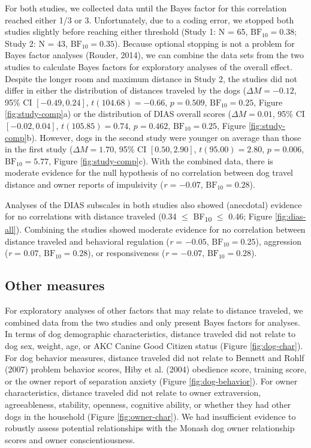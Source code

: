 \documentclass[
  pub,floatsintext]{apa6}
\begin{document}
For both studies, we collected data until the Bayes factor for this correlation reached either 1/3 or 3. Unfortunately, due to a coding error, we stopped both studies slightly before reaching either threshold (Study 1: N = 65, \(\mathrm{BF}_{\textrm{10}} = 0.38\); Study 2: N = 43, \(\mathrm{BF}_{\textrm{10}} = 0.35\)). Because optional stopping is not a problem for Bayes factor analyses (Rouder, 2014), we can combine the data sets from the two studies to calculate Bayes factors for exploratory analyses of the overall effect. Despite the longer room and maximum distance in Study 2, the studies did not differ in either the distribution of distances traveled by the dogs (\(\Delta M = -0.12\), 95\% CI \([-0.49, 0.24]\), \(t(104.68) = -0.66\), \(p = 0.509\), \(\mathrm{BF}_{\textrm{10}} = 0.25\), Figure \ref{fig:study-comp}a) or the distribution of DIAS overall scores (\(\Delta M = 0.01\), 95\% CI \([-0.02, 0.04]\), \(t(105.85) = 0.74\), \(p = 0.462\), \(\mathrm{BF}_{\textrm{10}} = 0.25\), Figure \ref{fig:study-comp}b). However, dogs in the second study were younger on average than those in the first study (\(\Delta M = 1.70\), 95\% CI \([0.50, 2.90]\), \(t(95.00) = 2.80\), \(p = 0.006\), \(\mathrm{BF}_{\textrm{10}} = 5.77\), Figure \ref{fig:study-comp}c). With the combined data, there is moderate evidence for the null hypothesis of no correlation between dog travel distance and owner reports of impulsivity (\emph{r} = \(-0.07\), \(\mathrm{BF}_{\textrm{10}} = 0.28\)).

Analyses of the DIAS subscales in both studies also showed (anecdotal) evidence for no correlations with distance traveled (0.34 \(\leq\) BF\textsubscript{10} \(\leq\) 0.46; Figure \ref{fig:dias-all}). Combining the studies showed moderate evidence for no correlation between distance traveled and behavioral regulation (\emph{r} = \(-0.05\), \(\mathrm{BF}_{\textrm{10}} = 0.25\)), aggression (\emph{r} = \(0.07\), \(\mathrm{BF}_{\textrm{10}} = 0.28\)), or responsiveness (\emph{r} = \(-0.07\), \(\mathrm{BF}_{\textrm{10}} = 0.28\)).

\hypertarget{other-measures}{%
\subsection{Other measures}\label{other-measures}}

For exploratory analyses of other factors that may relate to distance traveled, we combined data from the two studies and only present Bayes factors for analyses. In terms of dog demographic characteristics, distance traveled did not relate to dog sex, weight, age, or AKC Canine Good Citizen status (Figure \ref{fig:dog-char}). For dog behavior measures, distance traveled did not relate to Bennett and Rohlf (2007) problem behavior scores, Hiby et al. (2004) obedience score, training score, or the owner report of separation anxiety (Figure \ref{fig:dog-behavior}). For owner characteristics, distance traveled did not relate to owner extraversion, agreeableness, stability, openness, cognitive ability, or whether they had other dogs in the household (Figure \ref{fig:owner-char}). We had insufficient evidence to robustly assess potential relationships with the Monash dog owner relationship scores and owner conscientiousness.
\end{document}
